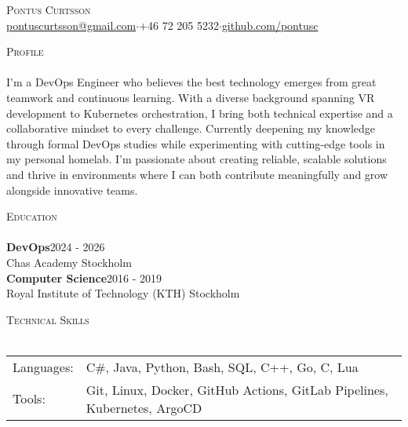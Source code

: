 \documentclass[a4paper]{article}
\newcommand{\lineunder} {
    \vspace*{-8pt} \\
    \hspace*{-18pt} \hrulefill \\
}
\newcommand{\header} [1] {
    {\hspace*{-18pt}\vspace*{6pt} \textsc{#1}}
    \vspace*{-6pt} \lineunder
}
\begin{document}
\vspace*{-40pt}

    

\vspace*{-10pt}

\begin{center}
	{\Huge \scshape {Pontus Curtsson}}\\
    \vspace{2mm}
	\href{mailto:pontuscurtsson@gmail.com}{pontuscurtsson@gmail.com}\hspace{3mm}$\cdot$\hspace{3mm}+46 72 205 5232\hspace{3mm}$\cdot$\hspace{3mm}\href{https://github.com/pontusc}{github.com/pontusc}\\
\end{center}
\vspace{2mm}

\header{Profile}
\vspace{4mm}
I'm a DevOps Engineer who believes the best technology emerges from great teamwork and continuous learning. With a diverse background spanning VR development to Kubernetes orchestration, I bring both technical expertise and a collaborative mindset to every challenge. Currently deepening my knowledge through formal DevOps studies while experimenting with cutting-edge tools in my personal homelab. 
\newline
\newline
I'm passionate about creating reliable, scalable solutions and thrive in environments where I can both contribute meaningfully and grow alongside innovative teams.
\vspace{8mm}

\header{Education}
\vspace{4mm}
\textbf{DevOps}\hfill 2024 - 2026\\
Chas Academy \hfill Stockholm\\
\vspace{4mm}
\textbf{Computer Science}\hfill 2016 - 2019\\
Royal Institute of Technology (KTH) \hfill Stockholm\\
\vspace{8mm}


\header{Technical Skills}
\vspace{4mm}
\begin{tabular}{ l l }
	Languages: & C\#, Java, Python, Bash, SQL, C++, Go, C, Lua\\[1mm]
	Tools:     & Git, Linux, Docker, GitHub Actions, GitLab Pipelines, Kubernetes, ArgoCD\\
\end{tabular}
\vspace{8mm}
\end{document}
